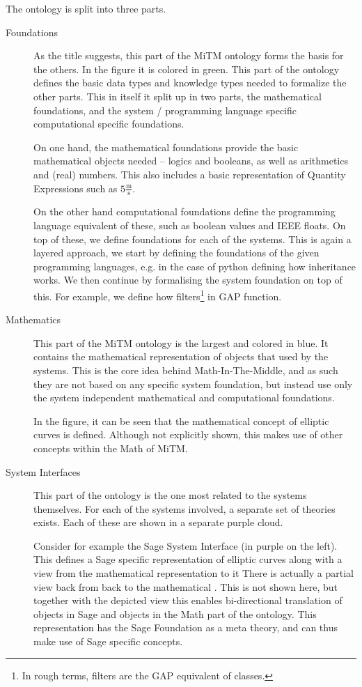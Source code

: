 The ontology is split into three parts. 
\begin{description}
  \item[Foundations]
    As the title suggests, this part of the MiTM ontology forms the basis for the others. 
    In the figure it is colored in green. 
    This part of the ontology defines the basic data types and knowledge types needed to formalize the other parts. 
    This in itself it split up in two parts, the mathematical foundations, and the system / programming language specific computational specific foundations. 

    On one hand, the mathematical foundations provide the basic mathematical objects needed -- logics and booleans, as well as arithmetics and (real) numbers. 
    This also includes a basic representation of Quantity Expressions such as $5 \frac{\mathrm{m}}{\mathrm{s}}$. 

    On the other hand computational foundations define the programming language equivalent of these, such as boolean values and IEEE floats. 
    On top of these, we define foundations for each of the systems. 
    This is again a layered approach, we start by defining the foundations of the given programming languages, e.g. in the case of python defining how inheritance works. 
    We then continue by formalising the system foundation on top of this. 
    For example, we define how filters\footnote{In rough terms, filters are the GAP equivalent of classes. } in GAP function. 

  \item[Mathematics]
    This part of the MiTM ontology is the largest and colored in blue. 
    It contains the mathematical representation of objects that used by the systems. 
    This is the core idea behind Math-In-The-Middle, and as such they are not based on any specific system foundation, but instead use only the system independent mathematical and computational foundations. 
    
    In the figure, it can be seen that the mathematical concept of elliptic curves is defined. 
    Although not explicitly shown, this makes use of other concepts within the Math of MiTM. 

  \item[System Interfaces]
    This part of the ontology is the one most related to the systems themselves. 
    For each of the systems involved, a separate set of theories exists. 
    Each of these are shown in a separate purple cloud. 

    Consider for example the Sage System Interface (in purple on the left). 
    This defines a Sage specific representation of elliptic curves along with a view from the mathematical representation to it
    There is actually a partial view back from  back to the mathematical . 
    This is not shown here, but together with the depicted view this enables bi-directional translation of objects in Sage and objects
    in the Math part of the ontology. 
    This representation has the Sage Foundation as a meta theory, and can thus make use of Sage specific concepts. 
    

\end{description}
